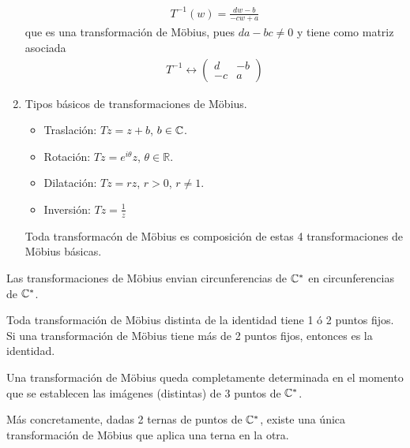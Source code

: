 \begin{enumerate}
\begin{align*}
              T^{-1}(w) = \frac{dw - b}{-cw + a}
          \end{align*}
          que es una transformación de M\"obius, pues $da - bc \not = 0$ y tiene como matriz asociada
          \begin{align*}
              T^{-1} \longleftrightarrow \begin{pmatrix}
                                             d  & -b \\
                                             -c & a
                                         \end{pmatrix}
          \end{align*}
    \item Tipos básicos de transformaciones de M\"obius.
          \begin{itemize}
              \item Traslación: $Tz = z + b$, $b \in \mathbb{C}$.
              \item Rotación: $Tz = e^{i\theta}z$, $\theta \in \mathbb{R}$.
              \item Dilatación: $Tz = rz$, $r > 0$, $r \not = 1$.
              \item Inversión: $Tz = \frac{1}{z}$
          \end{itemize}
          Toda transformacón de M\"obius es composición de estas 4 transformaciones de M\"obius básicas.
\end{enumerate}

\begin{prop}
    Las transformaciones de M\"obius envian circunferencias de $\mathbb{C}^*$ en circunferencias de $\mathbb{C}^*$.
\end{prop}

\begin{prop}
    Toda transformación de M\"obius distinta de la identidad tiene 1 ó 2 puntos fijos. Si una transformación de M\"obius tiene más de 2 puntos fijos, entonces es la identidad.
\end{prop}

\begin{teo}
    Una transformación de M\"obius queda completamente determinada en el momento que se establecen las imágenes (distintas) de 3 puntos de $\mathbb{C}^*$.

    Más concretamente, dadas 2 ternas de puntos de $\mathbb{C}^*$, existe una única transformación de M\"obius que aplica una terna en la otra.
\end{teo}

